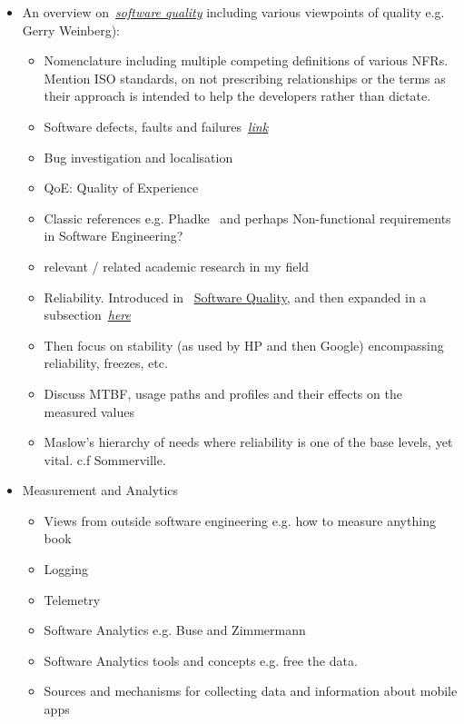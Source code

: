 \begin{itemize}
    \item An overview on~\href{software.quality}{\emph{software quality}} including various viewpoints of quality e.g. Gerry Weinberg):
    \begin{itemize} 
        \item Nomenclature including multiple competing definitions of various NFRs. Mention ISO standards, \citep[Chapter 5]{chung2000_non_functional_requirements_in_software_engineering} on not prescribing relationships or the terms as their approach is intended to help the developers rather than dictate.
        \item Software defects, faults and failures~\hyperlink{defects.faults.failures}{\emph{link}}
        \item Bug investigation and localisation
        \item QoE: Quality of Experience
        \item Classic references e.g. Phadke~\citep{phadke1995_quality_engineering_using_robust_design} and perhaps Non-functional requirements in Software Engineering? 
        \item relevant / related academic research in my field
        \item Reliability. Introduced in ~\hyperlink{software.quality}{Software Quality}, and then expanded in a subsection~\hyperlink{software.reliability}{\emph{here}}
        \item Then focus on stability (as used by HP and then Google) encompassing reliability, freezes, etc.
        \item Discuss MTBF, usage paths and profiles and their effects on the measured values
        \item Maslow's hierarchy of needs where reliability is one of the base levels, yet vital. c.f Sommerville.
    \end{itemize}
    \item Measurement and Analytics
    \begin{itemize}
        \item Views from outside software engineering e.g. how to measure anything book
        \item Logging
        \item Telemetry
        \item Software Analytics e.g. Buse and Zimmermann
        \item Software Analytics tools and concepts e.g. free the data.
        \item Sources and mechanisms for collecting data and information about mobile apps

\end{itemize}
\end{itemize}
